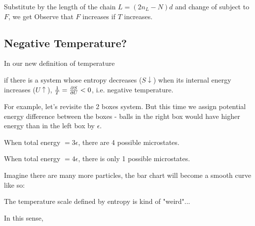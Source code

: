\documentclass[class=article, crop=false, 12pt]{standalone}
\begin{document}
Substitute by the length of the chain $L=(2n_L-N)d$ and change of subject to $F$, we get
Observe that $F$ increases if $T$ increases.


\subsection{Negative Temperature?}

In our new definition of temperature

if there is a system whose entropy decreases ($S\downarrow$) 
when its internal energy increases ($U\uparrow$), 
$\frac{1}{T} = \pdv{S}{U}<0$, i.e. negative temperature.

\begin{center}
\end{center}

For example, let's revisite the 2 boxes system.
But this time we assign potential energy difference between the boxes -
balls in the right box would have higher energy than in the left box by $\epsilon$.


When total energy $=3\epsilon$,
there are 4 possible microstates.


When total energy $=4\epsilon$,
there is only 1 possible microstates.



Imagine there are many more particles,
the bar chart will become a smooth curve like so:


The temperature scale defined by entropy is kind of "weird"...


In this sense, 


\theend
\end{document}
